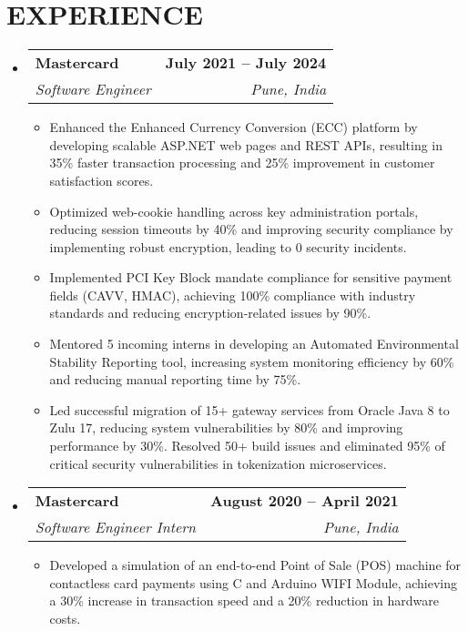\documentclass[letterpaper,10pt]{article}
\makeatletter
\newcommand{\resumeItem}[1]{
  \item\small{
    {#1 \vspace{-3pt}}
  }
}
\newcommand{\resumeSubheading}[4]{
  \vspace{-3pt}\item
    \begin{tabular*}{1.0\textwidth}[t]{l@{\extracolsep{\fill}}r}
      \textbf{#1} & \textbf{\small #2} \\
      \textit{\small#3} & \textit{\small #4} \\
    \end{tabular*}\vspace{-8pt}
}
\newcommand{\resumeSubHeadingListStart}{\begin{itemize}[leftmargin=0.0in, label={}]}
\newcommand{\resumeSubHeadingListEnd}{\end{itemize}}
\newcommand{\resumeItemListStart}{\begin{itemize}}
\newcommand{\resumeItemListEnd}{\end{itemize}\vspace{-5pt}}
\makeatother
\begin{document}
\section{EXPERIENCE}
  \resumeSubHeadingListStart
  
    \resumeSubheading
      {Mastercard}{July 2021 -- July 2024}
      {Software Engineer}{Pune, India}
      \resumeItemListStart
        \resumeItem{Enhanced the Enhanced Currency Conversion (ECC) platform by developing scalable ASP.NET web pages and REST APIs, resulting in 35\% faster transaction processing and 25\% improvement in customer satisfaction scores.}
        \resumeItem{Optimized web-cookie handling across key administration portals, reducing session timeouts by 40\% and improving security compliance by implementing robust encryption, leading to 0 security incidents.}
        \resumeItem{Implemented PCI Key Block mandate compliance for sensitive payment fields (CAVV, HMAC), achieving 100\% compliance with industry standards and reducing encryption-related issues by 90\%.}
        \resumeItem{Mentored 5 incoming interns in developing an Automated Environmental Stability Reporting tool, increasing system monitoring efficiency by 60\% and reducing manual reporting time by 75\%.}
        \resumeItem{Led successful migration of 15+ gateway services from Oracle Java 8 to Zulu 17, reducing system vulnerabilities by 80\% and improving performance by 30\%. Resolved 50+ build issues and eliminated 95\% of critical security vulnerabilities in tokenization microservices.}
      \resumeItemListEnd
      
    \resumeSubheading
      {Mastercard}{August 2020 -- April 2021}
      {Software Engineer Intern}{Pune, India}
      \resumeItemListStart
        \resumeItem{Developed a simulation of an end-to-end Point of Sale (POS) machine for contactless card payments using C and Arduino WIFI Module, achieving a 30\% increase in transaction speed and a 20\% reduction in hardware costs.}
      \resumeItemListEnd

  \resumeSubHeadingListEnd
\vspace{-10pt}

\end{document}
